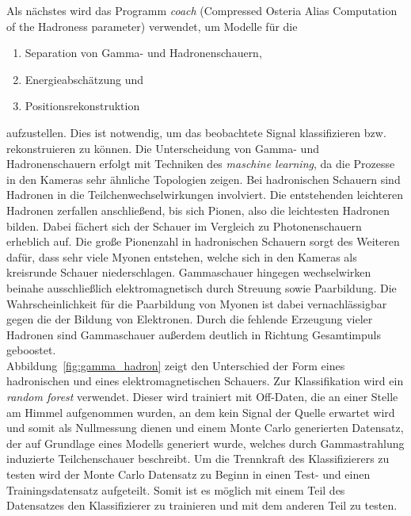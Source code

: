 Als nächstes wird das Programm \textit{coach} (Compressed Osteria Alias
Computation of the Hadroness parameter) verwendet, um Modelle für die
\begin{enumerate}
  \item Separation von Gamma- und Hadronenschauern,
  \item Energieabschätzung und
  \item Positionsrekonstruktion
\end{enumerate}
aufzustellen. Dies ist notwendig, um das beobachtete Signal klassifizieren bzw.
rekonstruieren zu können. Die Unterscheidung von Gamma- und Hadronenschauern
erfolgt mit Techniken des \textit{maschine learning}, da die Prozesse in den
Kameras sehr ähnliche Topologien zeigen. Bei hadronischen Schauern sind Hadronen
in die Teilchenwechselwirkungen involviert. Die entstehenden leichteren Hadronen
zerfallen anschließend, bis sich Pionen, also die leichtesten Hadronen bilden.
Dabei fächert sich der Schauer im Vergleich zu Photonenschauern erheblich auf.
Die große Pionenzahl in hadronischen Schauern sorgt des Weiteren dafür, dass
sehr viele Myonen entstehen, welche sich in den Kameras als kreisrunde Schauer
niederschlagen.
Gammaschauer hingegen wechselwirken beinahe ausschließlich elektromagnetisch
durch Streuung sowie Paarbildung. Die Wahrscheinlichkeit für die Paarbildung von
Myonen ist dabei vernachlässigbar gegen die der Bildung von Elektronen. Durch
die fehlende Erzeugung vieler Hadronen sind Gammaschauer außerdem deutlich in
Richtung Gesamtimpuls geboostet. \\
Abbildung~\ref{fig:gamma_hadron} zeigt den Unterschied der Form eines
hadronischen und eines elektromagnetischen Schauers. Zur Klassifikation wird ein
\textit{random forest} verwendet. Dieser wird trainiert mit Off-Daten, die an
einer Stelle am Himmel aufgenommen wurden, an dem kein Signal der Quelle
erwartet wird und somit als Nullmessung dienen und einem Monte Carlo generierten
Datensatz, der auf Grundlage eines Modells generiert wurde, welches durch
Gammastrahlung induzierte Teilchenschauer beschreibt. Um die Trennkraft des
Klassifizierers zu testen wird der Monte Carlo Datensatz zu Beginn in einen
Test- und einen Trainingsdatensatz aufgeteilt. Somit ist es möglich mit einem
Teil des Datensatzes den Klassifizierer zu trainieren und mit dem anderen Teil
zu testen.

